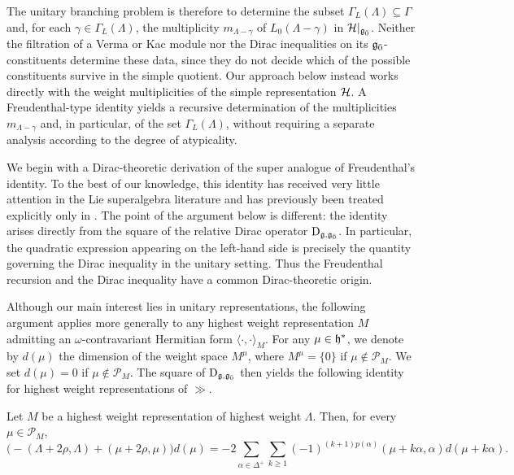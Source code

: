 The unitary branching problem is therefore to determine the subset $\Gamma_{L}(\Lambda)\subseteq\Gamma$ and, for each $\gamma\in\Gamma_{L}(\Lambda)$, the multiplicity $m_{\Lambda-\gamma}$ of $L_0(\Lambda-\gamma)$ in ${\mathcal{H}}\vert_{{\mathfrak{g}_{\bar{0}}}}$. Neither the filtration of a Verma or Kac module nor the Dirac inequalities on its ${\mathfrak{g}_{\bar{0}}}$-constituents determine these data, since they do not decide which of the possible constituents survive in the simple quotient. Our approach below instead works directly with the weight multiplicities of the simple representation ${\mathcal{H}}$. A Freudenthal-type identity yields a recursive determination of the multiplicities $m_{\Lambda-\gamma}$ and, in particular, of the set $\Gamma_{L}(\Lambda)$, without requiring a separate analysis according to the degree of atypicality.

We begin with a Dirac-theoretic derivation of the super analogue of Freudenthal's identity. To the best of our knowledge, this identity has received very little attention in the Lie superalgebra literature and has previously been treated explicitly only in \cite{Kang_Oh, Kang_Oh_Freudenthal}. The point of the argument below is different: the identity arises directly from the square of the relative Dirac operator $\operatorname{D}_{{\mathfrak{g}},{\mathfrak{g}_{\bar{0}}}}$. In particular, the quadratic expression appearing on the left-hand side is precisely the quantity governing the Dirac inequality in the unitary setting. Thus the Freudenthal recursion and the Dirac inequality have a common Dirac-theoretic origin.

 Although our main interest lies in unitary representations, the following argument applies more generally to any highest weight representation $M$ admitting an $\omega$-contravariant Hermitian form $\langle\cdot,\cdot\rangle_M$. For any $\mu\in{\mathfrak h}^{\ast}$, we denote by $d(\mu)$ the dimension of the weight space $M^\mu$, where $M^{\mu}=\{0\}$ if $\mu \notin \mathcal{P}_{M}$. We set $d(\mu)=0$ if $\mu \notin \mathcal{P}_{M}$. The square of $\operatorname{D}_{{\mathfrak{g}},{\mathfrak{g}_{\bar{0}}}}$ then yields the following identity for highest weight representations of $\gg$.

\begin{proposition}\label{prop::Freudenthal_identity}
Let $M$ be a highest weight representation of highest weight $\Lambda$. Then, for every $\mu\in\mathcal{P}_{M}$,
\[
\bigl(-(\Lambda+2\rho,\Lambda)+(\mu+2\rho,\mu)\bigr)d(\mu)
=
-2\sum_{\alpha\in\Delta^{+}}\sum_{k\geq1}
(-1)^{(k+1)p(\alpha)}
(\mu+k\alpha,\alpha)d(\mu+k\alpha).
\]
\end{proposition}

